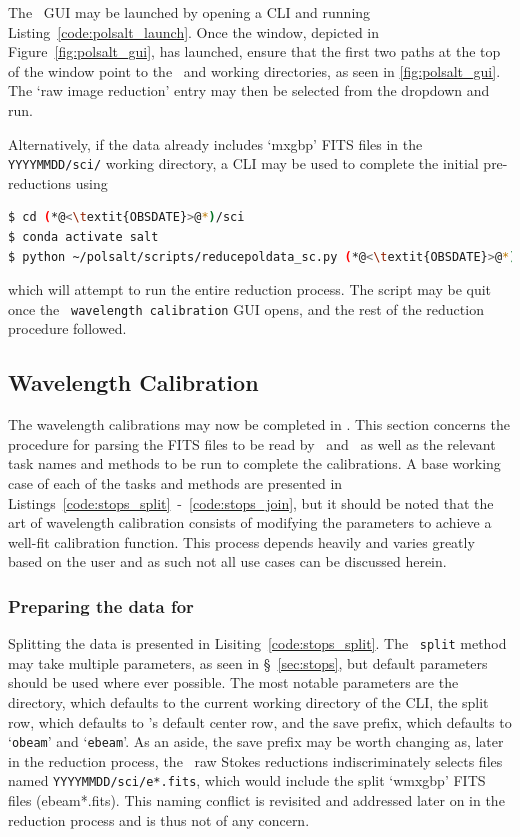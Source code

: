 The \polsalt\ \gls{GUI} may be launched by opening a \gls{CLI} and running Listing~\ref{code:polsalt_launch}. Once the window, depicted in Figure~\ref{fig:polsalt_gui}, has launched, ensure that the first two paths at the top of the window point to the \polsalt\ and working directories, as seen in \autoref{fig:polsalt_gui}. The `raw image reduction' entry may then be selected from the dropdown and run.

Alternatively, if the data already includes `mxgbp' \gls{FITS} files in the \texttt{YYYYMMDD/sci/} working directory, a \gls{CLI} may be used to complete the initial pre-reductions using
\begin{lstlisting}[language=bash]
$ cd (*@<\textit{OBSDATE}>@*)/sci
$ conda activate salt
$ python ~/polsalt/scripts/reducepoldata_sc.py (*@<\textit{OBSDATE}>@*)
\end{lstlisting}
{\parskip=0pt which} will attempt to run the entire reduction process. The script may be quit once the \polsalt\ \texttt{wavelength calibration} \gls{GUI} opens, and the rest of the reduction procedure followed.

\subsection{Wavelength Calibration} \label{subsec:reduc_wav}

The wavelength calibrations may now be completed in \iraf. This section concerns the procedure for parsing the \gls{FITS} files to be read by \iraf\ and \polsalt\ as well as the relevant task names and methods to be run to complete the calibrations. A base working case of each of the tasks and methods are presented in Listings~\ref{code:stops_split}~-~\ref{code:stops_join}, but it should be noted that the art of wavelength calibration consists of modifying the parameters to achieve a well-fit calibration function. This process depends heavily and varies greatly based on the user and as such not all use cases can be discussed herein.

\subsubsection{Preparing the data for \iraf}

Splitting the data is presented in Lisiting~\ref{code:stops_split}. The \stops\ \texttt{split} method may take multiple parameters, as seen in \S~\ref{sec:stops}, but default parameters should be used where ever possible. The most notable parameters are the directory, which defaults to the current working directory of the \gls{CLI}, the split row, which defaults to \polsalt's default center row, and the save prefix, which defaults to `\texttt{obeam}' and `\texttt{ebeam}'. As an aside, the save prefix may be worth changing as, later in the reduction process, the \polsalt\ raw Stokes reductions indiscriminately selects files named \texttt{YYYYMMDD/sci/e*.fits}, which would include the split `wmxgbp' \gls{FITS} files (ebeam*.fits). This naming conflict is revisited and addressed later on in the reduction process and is thus not of any concern.

